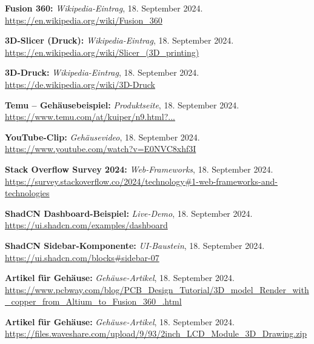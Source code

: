 \begin{thebibliography}{9999}
\textbf{Fusion 360:} \textit{Wikipedia-Eintrag}, 18. September 2024.  
\url{https://en.wikipedia.org/wiki/Fusion_360}

\textbf{3D-Slicer (Druck):} \textit{Wikipedia-Eintrag}, 18. September 2024.  
\url{https://en.wikipedia.org/wiki/Slicer_(3D_printing)}

\textbf{3D-Druck:} \textit{Wikipedia-Eintrag}, 18. September 2024.  
\url{https://de.wikipedia.org/wiki/3D-Druck}

\textbf{Temu – Gehäusebeispiel:} \textit{Produktseite}, 18. September 2024.  
\url{https://www.temu.com/at/kuiper/n9.html?...}

\textbf{YouTube-Clip:} \textit{Gehäusevideo}, 18. September 2024.  
\url{https://www.youtube.com/watch?v=E0NVC8xhf3I}

\textbf{Stack Overflow Survey 2024:} \textit{Web-Frameworks}, 18. September 2024.  
\url{https://survey.stackoverflow.co/2024/technology#1-web-frameworks-and-technologies}

\textbf{ShadCN Dashboard-Beispiel:} \textit{Live-Demo}, 18. September 2024.  
\url{https://ui.shadcn.com/examples/dashboard}

\textbf{ShadCN Sidebar-Komponente:} \textit{UI-Baustein}, 18. September 2024.  
\url{https://ui.shadcn.com/blocks#sidebar-07}

\textbf{Artikel für Gehäuse:} \textit{Gehäuse-Artikel}, 18. September 2024.  
\url{https://www.pcbway.com/blog/PCB_Design_Tutorial/3D_model_Render_with_copper_from_Altium_to_Fusion_360_.html}

\textbf{Artikel für Gehäuse:} \textit{Gehäuse-Artikel}, 18. September 2024.  
\url{https://files.waveshare.com/upload/9/93/2inch_LCD_Module_3D_Drawing.zip}

\end{thebibliography}
